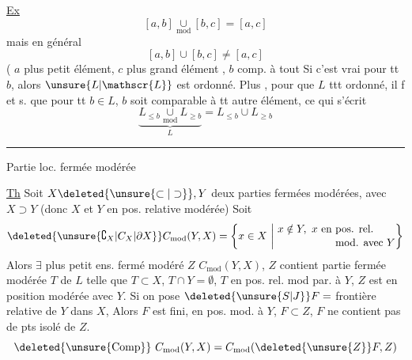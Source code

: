 \uline{Ex}
\[
[a,b]\underset{\mathrm{mod}}{\cup}[b,c]=[a,c]
\]
mais en général
\[
[a,b]\cup[b,c]\ne[a,c]
\]
( $a$ plus  petit élément, $c$ plus grand élément   , $b$  comp. à tout  Si c'est
vrai pour tt $b$, alors $\unsure{L|\mathscr{L}}$ est  ordonné. Plus , pour que $L$ ttt ordonné, il f et s. que pour tt $b\in L$, $b$ soit comparable à tt autre élément, ce qui s'écrit
\[
\underbrace{L_{\leq b}\underset{\mathrm{mod}}{\cup}L_{\geq b}}_{L}=L_{\leq b}\cup L_{\geq b}
\]
\begin{center}\rule{2.5cm}{0.35pt}\end{center}

Partie loc. fermée modérée

\uline{Th} Soit $X\deleted{\unsure{\subset|\supset}},Y$ deux parties fermées modérées, avec $X\supset Y$ (donc $X$ et $Y$ en pos. relative modérée)
 
Soit
\[
\deleted{\unsure{\complement_X|C_X|\partial X}} C_{\mathrm{mod}}(Y,X)=\left\{x\in X\ \middle|\ 
\begin{aligned}&x\notin Y,\ x\text{ en pos. rel.}\\[-2pt]&\hphantom{x\notin Y,\ x\text{ en }}\text{mod. avec }Y\end{aligned}\right\}
\]
Alors $\exists$ plus petit ens. fermé modéré $Z$    $C_{\mathrm{mod}}(Y,X)$,  $Z$  contient  partie fermée modérée $T$ de $L$ telle que $T\subset X$, $T\cap Y=\emptyset$, $T$ en pos. rel. mod par.  à $Y$,  $Z$ est en position modérée avec $Y$.
\scanpage{22}\mspage{21}
Si on pose $\deleted{\unsure{S|J}}F=$ frontière relative de $Y$ dans $X$,  Alors $F$ est fini,  en pos. mod.  à $Y$,  $F\subset Z$,   $F$ ne  contient pas de pts isolé de $Z$.
\deleted{et on a}
\[
\deleted{\unsure{\mathrm{Comp}}}\ C_{\mathrm{mod}}(Y,X)=C_{\mathrm{mod}}(\deleted{\unsure{Z}}F,Z)
\]

